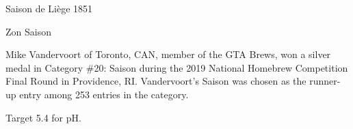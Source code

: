 \begin{recipie}{Saison de Liège 1851}
\begin{ingredientsblock}
\begin{hops}
\end{hops}

\begin{yeasts}
\end{yeasts}

\end{ingredientsblock}

\end{recipie}

\begin{recipie}{Zon Saison}

\begin{aboutblock}
Mike Vandervoort of Toronto, CAN, member of the GTA Brews, won a silver medal
in Category \#20: Saison during the 2019 National Homebrew Competition Final Round
in Providence, RI. Vandervoort’s Saison was chosen as the runner-up entry among 253
entries in the category.
\end{aboutblock}


\begin{methodandtiming}
 
\begin{mashsteps}
\end{mashsteps}

\begin{fermentationsteps}
\end{fermentationsteps}

\begin{directions}
Target 5.4 for pH.
\end{directions}

\end{methodandtiming}

\pagebreak

\begin{ingredientsblock}

\begin{malts}
\end{malts}


\end{ingredientsblock}
\end{recipie}
